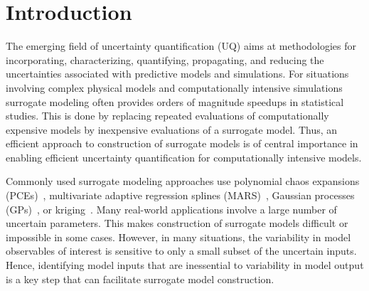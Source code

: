 \section{Introduction}
\label{sec:intro}


The emerging field of uncertainty quantification (UQ) aims at methodologies for
incorporating, characterizing, quantifying, propagating, and reducing the
uncertainties associated with predictive models and simulations.  For
situations involving complex physical models and computationally intensive
simulations surrogate modeling often provides orders of magnitude speedups in
statistical studies. This is done by replacing repeated evaluations of
computationally expensive models by inexpensive evaluations of a surrogate
model.  Thus, an efficient approach to construction of surrogate models is of
central importance in enabling efficient uncertainty quantification for
computationally intensive models. 


Commonly used surrogate modeling approaches use polynomial chaos expansions
(PCEs)~\cite{Xiu:2002,Ghanem:2003,Olivier:2010}, multivariate adaptive
regression splines (MARS)~\cite{friedman93}, Gaussian processes
(GPs)~\cite{Rasmussen:2004}, or kriging~\cite{Stein:2012}.  Many real-world
applications involve a large number of uncertain parameters. This makes
construction of surrogate models difficult or impossible in some cases.
However, in many situations, the variability in model observables of interest
is sensitive to only a small subset of the uncertain inputs.  Hence,
identifying model inputs that are inessential to variability in model output is
a key step that can facilitate surrogate model construction. 


